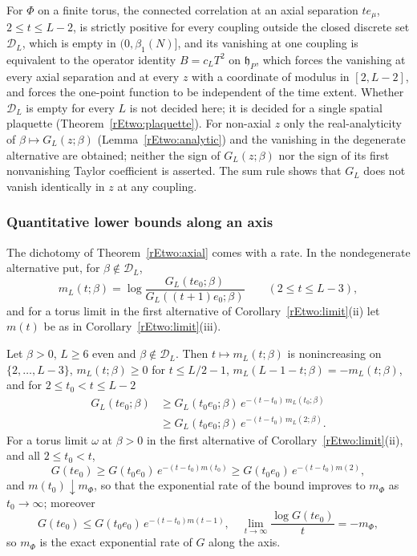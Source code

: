 \begin{remark}
\label{rEtwo:status1}
For $\Phi$ on a finite torus, the connected correlation at an axial
separation $te_\mu$, $2\le t\le L-2$, is strictly positive for every
coupling outside the closed discrete set $\mathcal D_L$, which is empty
in $(0,\beta_1(N)]$, and its vanishing at one coupling is equivalent to
the operator identity $B=c_LT^2$ on $\mathfrak h_P$, which forces the
vanishing at every axial separation and at every $z$ with a coordinate of
modulus in $[2,L-2]$, and forces the one-point function to be independent
of the time extent. Whether $\mathcal D_L$ is empty for every $L$ is not
decided here; it is decided for a single spatial plaquette
(Theorem~\ref{rEtwo:plaquette}). For non-axial $z$ only the
real-analyticity of $\beta\mapsto G_L(z;\beta)$ (Lemma~\ref{rEtwo:analytic})
and the vanishing in the degenerate alternative are obtained; neither the
sign of $G_L(z;\beta)$ nor the sign of its first nonvanishing Taylor
coefficient is asserted. The sum rule shows that $G_L$ does not vanish
identically in $z$ at any coupling.
\end{remark}

\subsubsection{Quantitative lower bounds along an axis}

The dichotomy of Theorem~\ref{rEtwo:axial} comes with a rate. In the
nondegenerate alternative put, for $\beta\notin\mathcal D_L$,
\[
m_L(t;\beta)=\log\frac{G_L(te_0;\beta)}{G_L((t+1)e_0;\beta)}\qquad
(2\le t\le L-3),
\]
and for a torus limit in the first alternative of
Corollary~\ref{rEtwo:limit}(ii) let $m(t)$ be as in
Corollary~\ref{rEtwo:limit}(iii).

\begin{theorem}\label{rEtwo:logconvex}
Let $\beta>0$, $L\ge6$ even and $\beta\notin\mathcal D_L$. Then $t\mapsto
m_L(t;\beta)$ is nonincreasing on $\{2,\dots,L-3\}$, $m_L(t;\beta)\ge0$ for
$t\le L/2-1$, $m_L(L-1-t;\beta)=-m_L(t;\beta)$, and for $2\le t_0<t\le L-2$
\begin{align*}
G_L(te_0;\beta)&\ge G_L(t_0e_0;\beta)\,e^{-(t-t_0)\,m_L(t_0;\beta)}\\
&\ge G_L(t_0e_0;\beta)\,e^{-(t-t_0)\,m_L(2;\beta)} .
\end{align*}
For a torus limit $\omega$ at $\beta>0$ in the first alternative of
Corollary~\textup{\ref{rEtwo:limit}(ii)}, and all $2\le t_0<t$,
\[
G(te_0)\ge G(t_0e_0)\,e^{-(t-t_0)m(t_0)}\ge G(t_0e_0)\,e^{-(t-t_0)m(2)},
\]
and $m(t_0)\downarrow m_\Phi$, so that the exponential rate of the bound
improves to $m_\Phi$ as $t_0\to\infty$; moreover
\[
G(te_0)\le G(t_0e_0)\,e^{-(t-t_0)m(t-1)},\quad
\lim_{t\to\infty}\frac{\log G(te_0)}{t}=-m_\Phi,
\]
so $m_\Phi$ is the exact exponential rate of $G$ along the axis.
\end{theorem}

